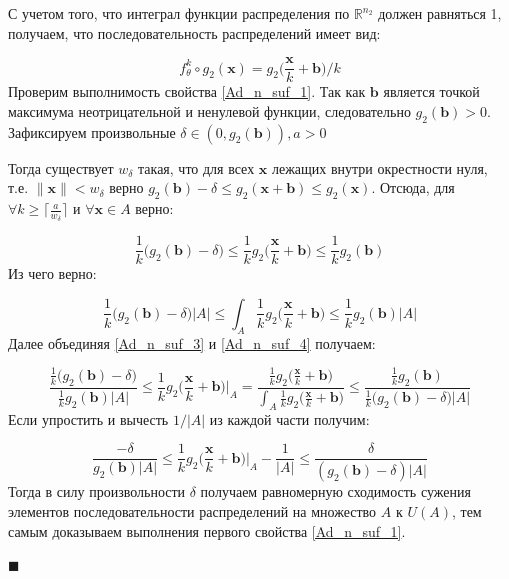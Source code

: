 \documentclass[12pt]{extarticle}
\newenvironment{Proof} %
    {\par\noindent{\bf Доказательство.}} %
    {\hfill$\scriptstyle\blacksquare$} %
\newcommand{\bfx}{\mathbf{x}}
\newcommand{\bfb}{\mathbf{b}}
\newcommand{\bbr}{\mathbb{R}}
\newcommand{\ceil}[1]{\lceil #1 \rceil}
\begin{document}
\begin{Proof}

С учетом того, что интеграл функции распределения по $\bbr^{n_2}$ должен равняться 1, получаем, что последовательность распределений имеет вид: 

$$f^k_{\theta}\circ g_2(\bfx) = g_2\Big(\frac{\bfx}{k} + \bfb\Big)\Big/
k$$ 
Проверим выполнимость свойства \eqref{Ad_n_suf_1}. Так как $\bfb$ является точкой максимума неотрицательной и ненулевой функции, следовательно $g_2(\bfb) > 0$. Зафиксируем произвольные $\delta \in (0, g_2(\bfb)), a > 0$ 

Тогда существует $w_\delta$ такая, что для всех $\bfx$ лежащих внутри окрестности нуля, т.е. $\|\bfx\| < w_\delta$ верно $g_2(\bfb) - \delta \leq g_2(\bfx + \bfb) \leq g_2(\bfx)$. Отсюда, для $\forall k \geq \ceil{\frac{a}{w_\delta}}$ и $\forall \bfx \in A$ верно:

\begin{equation}
    \label{Ad_n_suf_3}
    \frac{1}{k} \Big (g_2(\bfb) - \delta\Big) \leq \frac{1}{k} g_2\Big(\frac{\bfx}{k} + \bfb\Big) \leq \frac{1}{k} g_2(\bfb)
\end{equation}
Из чего верно:

\begin{equation}
    \label{Ad_n_suf_4}
    \frac{1}{k} \Big (g_2(\bfb) - \delta\Big)|A| \leq \int_A \frac{1}{k} g_2\Big(\frac{\bfx}{k} + \bfb\Big) \leq \frac{1}{k} g_2(\bfb) |A|
\end{equation}
Далее объединяя \eqref{Ad_n_suf_3} и \eqref{Ad_n_suf_4} получаем:

\begin{equation*}
    \frac{\frac{1}{k} \Big (g_2(\bfb) - \delta\Big)}{\frac{1}{k} g_2(\bfb) |A|} \leq \frac{1}{k} g_2\Big(\frac{\bfx}{k} + \bfb\Big)\Big|_A = \frac{\frac{1}{k} g_2\Big(\frac{\bfx}{k} + \bfb\Big)}{\int_A \frac{1}{k} g_2\Big(\frac{\bfx}{k} + \bfb\Big)} \leq \frac{\frac{1}{k} g_2(\bfb)}{\frac{1}{k} \Big (g_2(\bfb) - \delta\Big)|A|}
\end{equation*}
Если упростить и вычесть $1/|A|$ из каждой части получим:

\begin{equation}
    \label{Ad_n_suf_5}
    \frac{ - \delta}{g_2(\bfb) |A|} \leq \frac{1}{k} g_2\Big(\frac{\bfx}{k} + \bfb\Big)\Big|_A - \frac{1}{|A|} \leq \frac{\delta}{(g_2(\bfb) - \delta)|A|}
\end{equation}
Тогда в силу произвольности $\delta$ получаем равномерную сходимость сужения элементов последовательности распределений на множество $A$ к $U(A)$, тем самым доказываем выполнения первого свойства \eqref{Ad_n_suf_1}.


\end{Proof}
\end{document}
